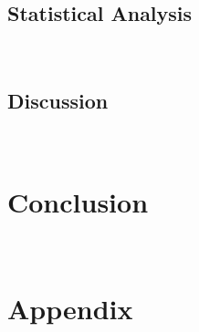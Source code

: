 \documentclass[parskip=full]{scrartcl}
\begin{document}
\subsection{Statistical Analysis}~\label{sec:statistical_analysis}

\subsection{Discussion}~\label{sec:discussion}

\section{Conclusion}~\label{sec:conclusion}




\appendix

\section{Appendix}


\end{document}
